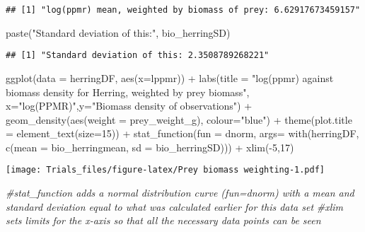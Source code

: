 \documentclass[
]{article}
\newenvironment{Shaded}{\begin{snugshade}}{\end{snugshade}}
\newcommand{\AttributeTok}[1]{\textcolor[rgb]{0.77,0.63,0.00}{#1}}
\newcommand{\CommentTok}[1]{\textcolor[rgb]{0.56,0.35,0.01}{\textit{#1}}}
\newcommand{\DecValTok}[1]{\textcolor[rgb]{0.00,0.00,0.81}{#1}}
\newcommand{\FunctionTok}[1]{\textcolor[rgb]{0.00,0.00,0.00}{#1}}
\newcommand{\NormalTok}[1]{#1}
\newcommand{\SpecialCharTok}[1]{\textcolor[rgb]{0.00,0.00,0.00}{#1}}
\newcommand{\StringTok}[1]{\textcolor[rgb]{0.31,0.60,0.02}{#1}}
\begin{document}
\begin{verbatim}
## [1] "log(ppmr) mean, weighted by biomass of prey: 6.62917673459157"
\end{verbatim}

\begin{Shaded}
\begin{Highlighting}[]
\FunctionTok{paste}\NormalTok{(}\StringTok{"Standard deviation of this:"}\NormalTok{, bio\_herringSD)}
\end{Highlighting}
\end{Shaded}

\begin{verbatim}
## [1] "Standard deviation of this: 2.3508789268221"
\end{verbatim}

\begin{Shaded}
\begin{Highlighting}[]
\FunctionTok{ggplot}\NormalTok{(}\AttributeTok{data =}\NormalTok{ herringDF, }\FunctionTok{aes}\NormalTok{(}\AttributeTok{x=}\NormalTok{lppmr)) }\SpecialCharTok{+} 
          \FunctionTok{labs}\NormalTok{(}\AttributeTok{title =} \StringTok{"log(ppmr) against biomass density for Herring, weighted by prey biomass"}\NormalTok{, }
               \AttributeTok{x=}\StringTok{"log(PPMR)"}\NormalTok{,}\AttributeTok{y=}\StringTok{"Biomass density of observations"}\NormalTok{) }\SpecialCharTok{+}
          \FunctionTok{geom\_density}\NormalTok{(}\FunctionTok{aes}\NormalTok{(}\AttributeTok{weight =}\NormalTok{ prey\_weight\_g), }\AttributeTok{colour=}\StringTok{"blue"}\NormalTok{) }\SpecialCharTok{+} 
          \FunctionTok{theme}\NormalTok{(}\AttributeTok{plot.title =} \FunctionTok{element\_text}\NormalTok{(}\AttributeTok{size=}\DecValTok{15}\NormalTok{)) }\SpecialCharTok{+} 
          \FunctionTok{stat\_function}\NormalTok{(}\AttributeTok{fun =}\NormalTok{ dnorm, }\AttributeTok{args=} \FunctionTok{with}\NormalTok{(herringDF, }\FunctionTok{c}\NormalTok{(}\AttributeTok{mean =}\NormalTok{ bio\_herringmean, }\AttributeTok{sd =}\NormalTok{ bio\_herringSD))) }\SpecialCharTok{+}
          \FunctionTok{xlim}\NormalTok{(}\SpecialCharTok{{-}}\DecValTok{5}\NormalTok{,}\DecValTok{17}\NormalTok{)}
\end{Highlighting}
\end{Shaded}

\texttt{[image: Trials\_files/figure-latex/Prey biomass weighting-1.pdf]}

\begin{Shaded}
\begin{Highlighting}[]
\CommentTok{\#stat\_function adds a normal distribution curve (fun=dnorm) with a mean and standard deviation equal to what was calculated earlier for this data set}
\CommentTok{\#xlim sets limits for the x{-}axis so that all the necessary data points can be seen}
\end{Highlighting}
\end{Shaded}
\end{document}
